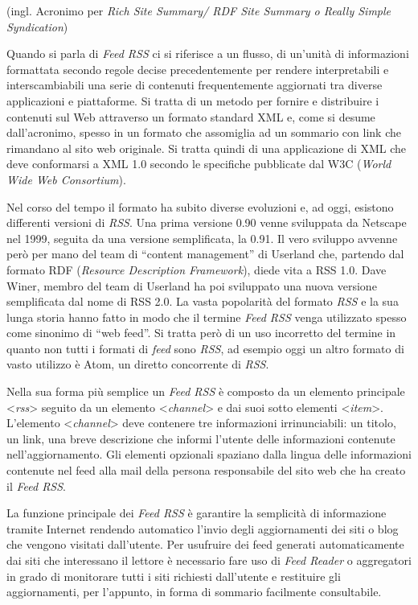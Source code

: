 \documentclass[
  b5paper,
  twoside,
  11pt,
  chapterprefix=false,
  bibliography=totocnumbered,
  listof=flat]{scrbook}
\begin{document}
(ingl. Acronimo per \emph{Rich Site Summary/ RDF Site Summary o Really Simple
Syndication})

Quando si parla di \emph{Feed RSS} ci si riferisce a un flusso, di un'unità
di informazioni formattata secondo regole decise precedentemente per
rendere interpretabili e interscambiabili una serie di contenuti
frequentemente aggiornati tra diverse applicazioni e piattaforme. Si
tratta di un metodo per fornire e distribuire i contenuti sul Web
attraverso un formato standard XML e, come si desume dall'acronimo,
spesso in un formato che assomiglia ad un sommario con link che
rimandano al sito web originale. Si tratta quindi di una applicazione di
XML che deve conformarsi a XML 1.0 secondo le specifiche pubblicate dal
W3C (\emph{World Wide Web Consortium}).

Nel corso del tempo il formato ha subito diverse evoluzioni e, ad oggi,
esistono differenti versioni di \emph{RSS}. Una prima versione 0.90 venne
sviluppata da Netscape nel 1999, seguita da una versione semplificata,
la 0.91. Il vero sviluppo avvenne però per mano del team di \enquote{content
management} di Userland che, partendo dal formato RDF (\emph{Resource
Description Framework}), diede vita a RSS 1.0. Dave Winer, membro del
team di Userland ha poi sviluppato una nuova versione semplificata dal
nome di RSS 2.0. La vasta popolarità del formato \emph{RSS} e la sua lunga
storia hanno fatto in modo che il termine \emph{Feed RSS} venga utilizzato
spesso come sinonimo di \enquote{web feed}. Si tratta però di un uso incorretto
del termine in quanto non tutti i formati di \emph{feed} sono \emph{RSS}, ad
esempio oggi un altro formato di vasto utilizzo è Atom, un diretto
concorrente di \emph{RSS}.

Nella sua forma più semplice un \emph{Feed RSS} è composto da un elemento
principale \textless{}\emph{rss}\textgreater{} seguito da un elemento \textless{}\emph{channel}\textgreater{} e dai suoi
sotto elementi \textless{}\emph{item}\textgreater. L'elemento \textless{}\emph{channel}\textgreater{} deve contenere tre
informazioni irrinunciabili: un titolo, un link, una breve descrizione
che informi l'utente delle informazioni contenute nell'aggiornamento.
Gli elementi opzionali spaziano dalla lingua delle informazioni
contenute nel feed alla mail della persona responsabile del sito web che
ha creato il \emph{Feed RSS}.

La funzione principale dei \emph{Feed RSS} è garantire la semplicità di
informazione tramite Internet rendendo automatico l'invio degli
aggiornamenti dei siti o blog che vengono visitati dall'utente. Per
usufruire dei feed generati automaticamente dai siti che interessano il
lettore è necessario fare uso di \emph{Feed Reader} o aggregatori in grado di
monitorare tutti i siti richiesti dall'utente e restituire gli
aggiornamenti, per l'appunto, in forma di sommario facilmente
consultabile.
\end{document}
